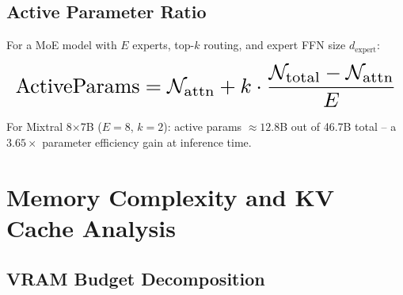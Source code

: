 \documentclass[10pt,journal,compsoc,twocolumn]{IEEEtran}
\begin{document}
\subsection{Active Parameter Ratio}


For a MoE model with $E$ experts, top-$k$ routing, and expert FFN size $d_{\text{expert}}$:



























\begin{equation}
\resizebox{\columnwidth}{!}{$\displaystyle
\begin{aligned}
\text{ActiveParams} = \mathcal{N}_{\text{attn}} + k \cdot \frac{\mathcal{N}_{\text{total}} - \mathcal{N}_{\text{attn}}}{E}
\end{aligned}
$}
\end{equation}



























For Mixtral 8$\times$7B ($E = 8$, $k = 2$): active params $\approx 12.8$B out of 46.7B total -- a $3.65\times$ parameter efficiency gain at inference time.




\section{Memory Complexity and KV Cache Analysis}



\subsection{VRAM Budget Decomposition}
\end{document}
